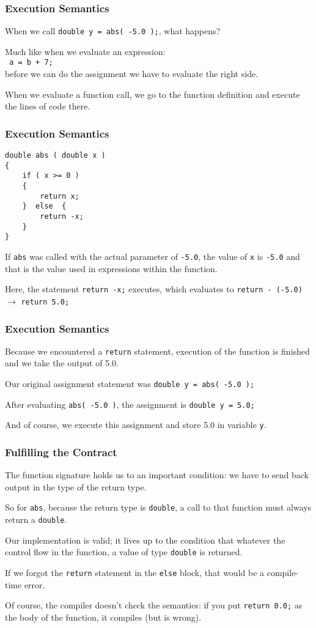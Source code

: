 \begin{frame}[fragile]
\frametitle{Execution Semantics}
When we call \texttt{double y = abs( -5.0 );}, what happens?

Much like when we evaluate an expression:\\
\quad \texttt{ a = b + 7;}\\
before we can do the assignment we have to evaluate the right side.

When we evaluate a function call, we go to the function definition and execute the lines of code there.

\end{frame}

\begin{frame}[fragile]
\frametitle{Execution Semantics}

\begin{verbatim}
double abs ( double x ) 
{
    if ( x >= 0 ) 
    {
        return x;
    }  else  {
        return -x;
    }
}
\end{verbatim}

If \texttt{abs} was called with the actual parameter of \texttt{-5.0}, the value of \texttt{x} is \texttt{-5.0} and that is the value used in expressions within the function.

Here, the statement \texttt{return -x;} executes, which evaluates to \texttt{return - (-5.0)} $\rightarrow$ \texttt{return 5.0;}

\end{frame}

\begin{frame}
\frametitle{Execution Semantics}

Because we encountered a \texttt{return} statement, execution of the function is finished and we take the output of 5.0.

Our original assignment statement was \texttt{double y = abs( -5.0 );}

After evaluating \texttt{abs( -5.0 )}, the assignment is \texttt{double y = 5.0;}

And of course, we execute this assignment and store 5.0 in variable \texttt{y}.

\end{frame}

\begin{frame}
\frametitle{Fulfilling the Contract}

The function signature holds us to an important condition: we have to send back output in the type of the return type.

So for \texttt{abs}, because the return type is \texttt{double}, a call to that function must always return a \texttt{double}.


Our implementation is valid; it lives up to the condition that whatever the control flow in the function, a value of type \texttt{double} is returned.

If we forgot the \texttt{return} statement in the \texttt{else} block, that would be a compile-time error.

Of course, the compiler doesn't check the semantics: if you put \texttt{return 0.0;} as the body of the function, it compiles (but is wrong).

\end{frame}


